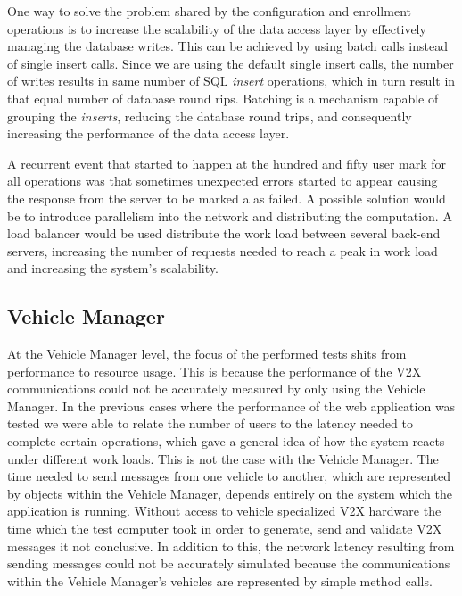 One way to solve the problem shared by the configuration and enrollment operations is to increase the scalability of the data access layer by effectively managing the database writes. This can be achieved by using batch calls instead of single insert calls. Since we are using the default single insert calls, the number of writes results in same number of SQL \textit{insert} operations, which in turn result in that equal number of database round rips. Batching is a mechanism capable of grouping the \textit{inserts}, reducing the database round trips, and consequently increasing the performance of the data access layer. 

A recurrent event that started to happen at the hundred and fifty user mark for all operations was that sometimes unexpected errors started to appear causing the response from the server to be marked a as failed. A possible solution would be to introduce parallelism into the network and distributing the computation. A load balancer would be used distribute the work load between several back-end servers, increasing the number of requests needed to reach a peak in work load and increasing the system's scalability. 



\subsection{Vehicle Manager}
\label{section:memory}
At the Vehicle Manager level, the focus of the performed tests shits from performance to resource usage. This is because the performance of the V2X communications could not be accurately measured by only using the Vehicle Manager. In the previous cases where the performance of the web application was tested we were able to relate the number of users to the latency needed to complete certain operations, which gave a general idea of how the system reacts under different work loads. This is not the case with the Vehicle Manager. The time needed to send messages from one vehicle to another, which are represented by objects within the Vehicle Manager, depends entirely on the system which the application is running. Without access to vehicle specialized V2X hardware the time which the test computer took in order to generate, send and validate V2X messages it not conclusive. In addition to this, the network latency resulting from sending messages could not be accurately simulated because the communications within the Vehicle Manager's vehicles are represented by simple method calls. 

